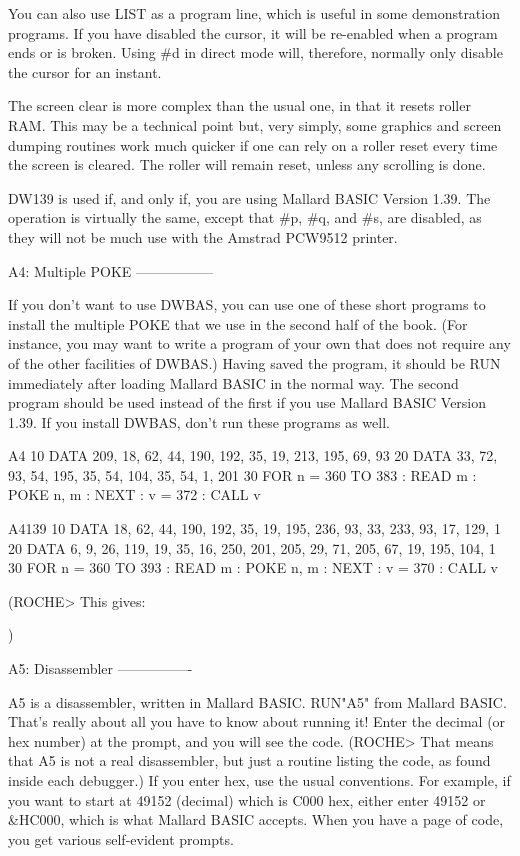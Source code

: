 You can also use LIST as a program line, which is useful in some demonstration 
programs.  If  you  have disabled the cursor, it will  be  re-enabled  when  a 
program  ends or is broken. Using #d in direct mode will, therefore,  normally 
only disable the cursor for an instant.

The screen clear is more complex than the usual one, in that it resets  roller 
RAM. This may be a technical point but, very simply, some graphics and  screen 
dumping  routines  work much quicker if one can rely on a roller  reset  every 
time the screen is cleared. The roller will remain reset, unless any scrolling 
is done.

DW139  is used if, and only if, you are using Mallard BASIC Version 1.39.  The 
operation is virtually the same, except that #p, #q, and #s, are disabled,  as 
they will not be much use with the Amstrad PCW9512 printer.


A4: Multiple POKE
-----------------

If  you  don't want to use DWBAS, you can use one of these short  programs  to 
install  the  multiple POKE that we use in the second half of the  book.  (For 
instance,  you may want to write a program of your own that does  not  require 
any of the other facilities of DWBAS.) Having saved the program, it should  be 
RUN  immediately  after loading Mallard BASIC in the normal  way.  The  second 
program  should be used instead of the first if you use Mallard BASIC  Version 
1.39. If you install DWBAS, don't run these programs as well.

        A4
        10 DATA 209, 18, 62, 44, 190, 192, 35, 19, 213, 195, 69, 93
        20 DATA 33, 72, 93, 54, 195, 35, 54, 104, 35, 54, 1, 201
        30 FOR n = 360 TO 383 : READ m : POKE n, m : NEXT : v = 372 : CALL v

        A4139
        10  DATA 18, 62, 44, 190, 192, 35, 19, 195, 236, 93, 33, 233, 93,  17, 
129, 1
        20 DATA 6, 9, 26, 119, 19, 35, 16, 250, 201, 205, 29, 71, 205, 67, 19, 
195, 104, 1
        30 FOR n = 360 TO 393 : READ m : POKE n, m : NEXT : v = 370 : CALL v

(ROCHE> This gives:

$$$$
)


A5: Disassembler
----------------

A5  is a disassembler, written in Mallard BASIC. RUN"A5" from  Mallard  BASIC. 
That's  really about all you have to know about running it! Enter the  decimal 
(or  hex number) at the prompt, and you will see the code. (ROCHE> That  means 
that  A5 is not a real disassembler, but just a routine listing the  code,  as 
found inside each debugger.) If you enter hex, use the usual conventions.  For 
example,  if  you want to start at 49152 (decimal) which is C000  hex,  either 
enter  49152 or &HC000, which is what Mallard BASIC accepts. When you  have  a 
page of code, you get various self-evident prompts.

